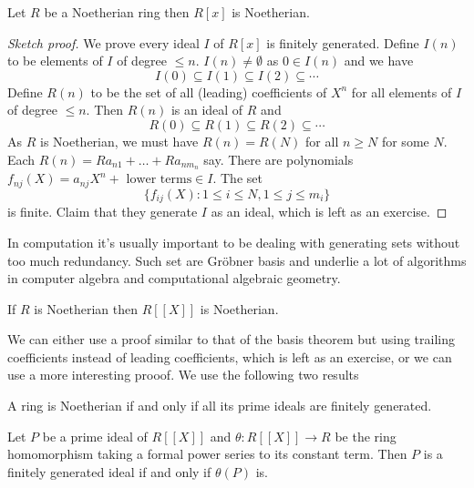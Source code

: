 \documentclass[a4paper]{article}
\begin{document}
\begin{theorem}
  Let \(R\) be a Noetherian ring then \(R[x]\) is Noetherian.
\end{theorem}

\begin{proof}[Sketch proof]
  We prove every ideal \(I\) of \(R[x]\) is finitely generated. Define \(I(n)\) to be elements of \(I\) of degree \(\leq n\). \(I(n) \neq \emptyset\) as \(0 \in I(n)\) and we have
  \[
    I(0) \subseteq I(1) \subseteq I(2) \subseteq \cdots
  \]
  Define \(R(n)\) to be the set of all (leading) coefficients of \(X^n\) for all elements of \(I\) of degree \(\leq n\). Then \(R(n)\) is an ideal of \(R\) and
  \[
    R(0) \subseteq R(1) \subseteq R(2) \subseteq \cdots
  \]
  As \(R\) is Noetherian, we must have \(R(n) = R(N)\) for all \(n \geq N\) for some \(N\). Each \(R(n) = R a_{n1} + \dots + R a_{n m_n}\) say. There are polynomials \(f_{nj}(X) = a_{nj} X^n + \text{ lower terms} \in I\). The set
  \[
    \{f_{ij}(X): 1 \leq i \leq N, 1 \leq j \leq m_i\}
  \]
  is finite. Claim that they generate \(I\) as an ideal, which is left as an exercise.
\end{proof}

\begin{remark}
  In computation it's usually important to be dealing with generating sets without too much redundancy. Such set are Gröbner basis and underlie a lot of algorithms in computer algebra and computational algebraic geometry.
\end{remark}

\begin{theorem}
  If \(R\) is Noetherian then \(R[[X]]\) is Noetherian.
\end{theorem}

We can either use a proof similar to that of the basis theorem but using trailing coefficients instead of leading coefficients, which is left as an exercise, or we can use a more interesting prooof. We use the following two results

\begin{theorem}[Cohn]
  \label{thm:Cohn}
  A ring is Noetherian if and only if all its prime ideals are finitely generated. 
\end{theorem}

\begin{lemma}
  \label{lem:prime ideals of R[[x]]}
  Let \(P\) be a prime ideal of \(R[[X]]\) and \(\theta: R[[X]] \to R\) be the ring homomorphism taking a formal power series to its constant term. Then \(P\) is a finitely generated ideal if and only if \(\theta(P)\) is.
\end{lemma}
\end{document}
